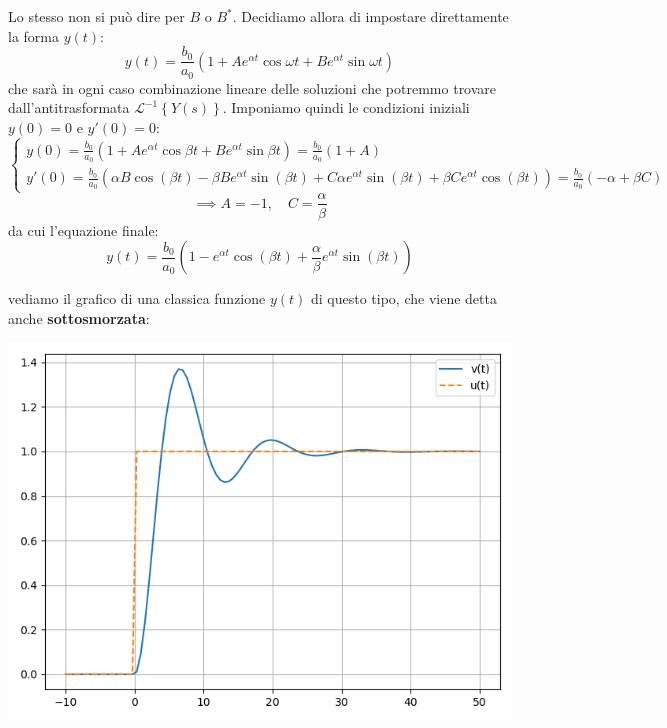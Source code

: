 \documentclass[a4paper,11pt]{article}
\begin{document}
Lo stesso non si può dire per $B$ o $B^*$.
Decidiamo allora di impostare direttamente la forma $y(t)$:
$$
y(t) = \frac{b_0}{a_0} \left( 1 + A e^{\alpha t} \cos{\omega t} + B e^{\alpha t} \sin{\omega t} \right)
$$
che sarà in ogni caso combinazione lineare delle soluzioni che potremmo trovare dall'antitrasformata $\mathcal{L}^{-1} \left\{ Y(s) \right\}$.
Imponiamo quindi le condizioni iniziali $y(0) = 0$ e $y'(0) = 0$:
\[
	\begin{cases}
		y(0) =  \frac{b_0}{a_0} \left( 1 + A e^{\alpha t} \cos{\beta t} + B e^{\alpha t} \sin{\beta t} \right)
		= \frac{b_0}{a_0} \left( 1 + A \right) \\
		y'(0) = \frac{b_0}{a_0} \left( \alpha B \cos(\beta t) - \beta B e^{\alpha t} \sin(\beta t) + C \alpha e^{\alpha t}\sin(\beta t) + \beta C e^{\alpha t} \cos(\beta t) \right)
		= \frac{b_0}{a_0} \left( -\alpha + \beta C \right)
	\end{cases}
\]
$$
	\implies A = -1, \quad C = \frac{\alpha}{\beta}
$$
da cui l'equazione finale:
$$
y\left(t\right)=\frac{b_{0}}{a_{0}}\left(1-e^{\alpha t}\cos\left(\beta t\right)+\frac{\alpha}{\beta}e^{\alpha t}\sin\left(\beta t\right)\right)
$$

\noindent
\begin{minipage}{\textwidth}
vediamo il grafico di una classica funzione $y(t)$ di questo tipo, che viene detta anche \textbf{sottosmorzata}:
\begin{center}
	\includegraphics[scale=0.66]{../figures/second_degree_underdamped.png}
\end{center}
\end{minipage}
\end{document}
